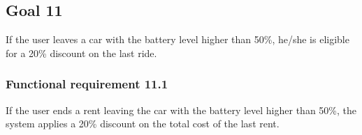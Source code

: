 \subsection{Goal 11}
If the user leaves a car with the battery level higher than 50\%, he/she is eligible for a 20\% discount on the last ride.

\setcounter{secnumdepth}{3}
\subsubsection{Functional requirement 11.1}
If the user ends a rent leaving the car with the battery level higher than 50\%, the system applies a 20\% discount on the total cost of the last rent.
